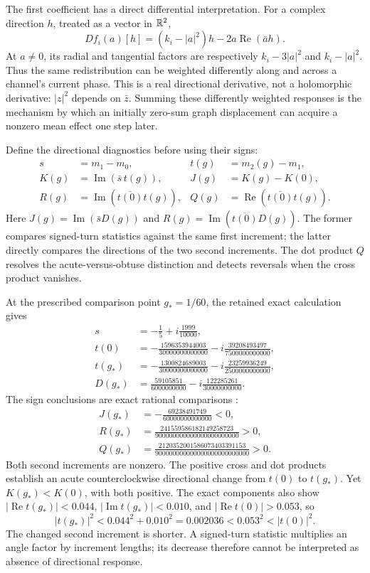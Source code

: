 \documentclass[11pt,a4paper]{article}
\numberwithin{equation}{section}
\theoremstyle{remark}\newtheorem{remark}[theorem]{Remark}
\newcommand{\re}{\operatorname{Re}}\newcommand{\im}{\operatorname{Im}}
\begin{document}
The first coefficient has a direct differential interpretation. For a complex direction $h$, treated as a vector in $\mathbb R^2$,
\begin{equation}
Df_i(a)[h]=(k_i-|a|^2)h-2a\re(\bar a h).\label{eq:realderivative}
\end{equation}
At $a\ne0$, its radial and tangential factors are respectively $k_i-3|a|^2$ and $k_i-|a|^2$. Thus the same redistribution can be weighted differently along and across a channel's current phase. This is a real directional derivative, not a holomorphic derivative: $|z|^2$ depends on $\bar z$. Summing these differently weighted responses is the mechanism by which an initially zero-sum graph displacement can acquire a nonzero mean effect one step later.

Define the directional diagnostics before using their signs:
\begin{align}
s&=m_1-m_0,&t(g)&=m_2(g)-m_1,\\
K(g)&=\im(\bar s\,t(g)),&J(g)&=K(g)-K(0),\label{eq:diagnostics}\\
R(g)&=\im(\overline{t(0)}t(g)),&Q(g)&=\re(\overline{t(0)}t(g)).
\end{align}
Here $J(g)=\im(\bar sD(g))$ and $R(g)=\im(\overline{t(0)}D(g))$. The former compares signed-turn statistics against the same first increment; the latter directly compares the directions of the two second increments. The dot product $Q$ resolves the acute-versus-obtuse distinction and detects reversals when the cross product vanishes.

At the prescribed comparison point $g_*=1/60$, the retained exact calculation gives
\begin{align}
s&=-\frac15+i\frac{1999}{10000},\\
t(0)&=-\frac{1596353944003}{30000000000000}
       -i\frac{39208493497}{7500000000000},\label{eq:t0}\\
t(g_*)&=-\frac{1300824689003}{30000000000000}
       -i\frac{23259936249}{2500000000000},\label{eq:tg}\\
D(g_*)&=\frac{59105851}{6000000000}
        -i\frac{122285261}{30000000000}.\label{eq:Dstar}
\end{align}
The sign conclusions are exact rational comparisons \cite{graphreceipt}:
\begin{align}
J(g_*)&=-\frac{69238491749}{60000000000000}<0,\\
R(g_*)&=\frac{241559586182149258723}{900000000000000000000000}>0,\\
Q(g_*)&=\frac{2120352001586073403391153}{900000000000000000000000000}>0.
\label{eq:signs}
\end{align}
Both second increments are nonzero. The positive cross and dot products establish an acute counterclockwise directional change from $t(0)$ to $t(g_*)$. Yet $K(g_*)<K(0)$, with both positive. The exact components also show $|\re t(g_*)|<0.044$, $|\im t(g_*)|<0.010$, and $|\re t(0)|>0.053$, so
\[
|t(g_*)|^2<0.044^2+0.010^2=0.002036
<0.053^2<|t(0)|^2.
\]
The changed second increment is shorter. A signed-turn statistic multiplies an angle factor by increment lengths; its decrease therefore cannot be interpreted as absence of directional response.
\end{document}
